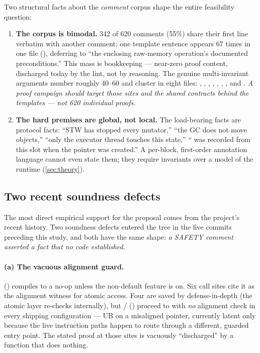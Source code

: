 Two structural facts about the \emph{comment} corpus shape the entire
feasibility question:

\begin{enumerate}[leftmargin=1.6em]
\item \textbf{The corpus is bimodal.} 342 of 620 comments (55\%) share
  their first line verbatim with another comment; one template sentence
  appears 67 times in one file
  (), deferring to ``the
  enclosing raw-memory operation's documented preconditions.'' This mass
  is bookkeeping --- near-zero proof content, discharged today by the
  lint, not by reasoning. The genuine multi-invariant arguments number
  roughly 40--60 and cluster in eight files: ,
  , , ,
  , , , and
  . \emph{A proof campaign should target those
  sites and the shared contracts behind the templates --- not 620
  individual proofs.}
\item \textbf{The hard premises are global, not local.} The
  load-bearing facts are protocol facts: ``STW has stopped every
  mutator,'' ``the GC does not move objects,'' ``only the executor
  thread touches this state,'' `` was recorded from this slot
  when the pointer was created.'' A per-block, first-order annotation
  language cannot even state them; they require invariants over a model
  of the runtime (\cref{sec:theory}).
\end{enumerate}

\subsection{Two recent soundness defects}
\label{sec:system-defects}

The most direct empirical support for the proposal comes from the
project's recent history. Two soundness defects entered the tree in
the five commits preceding this study, and both have the same shape:
\emph{a SAFETY comment asserted a fact that no code established}.

\paragraph{(a) The vacuous alignment guard.} 
() compiles to a no-op unless the
non-default  feature is on. Six call sites cite
it as the alignment witness for atomic access. Four are saved by
defense-in-depth (the atomic layer re-checks internally), but
/
() proceed to
 with \emph{no} alignment check in every
shipping configuration --- UB on a misaligned pointer, currently latent
only because the live instruction paths happen to route through a
different, guarded entry point. The stated proof at those sites is
vacuously ``discharged'' by a function that does nothing.

